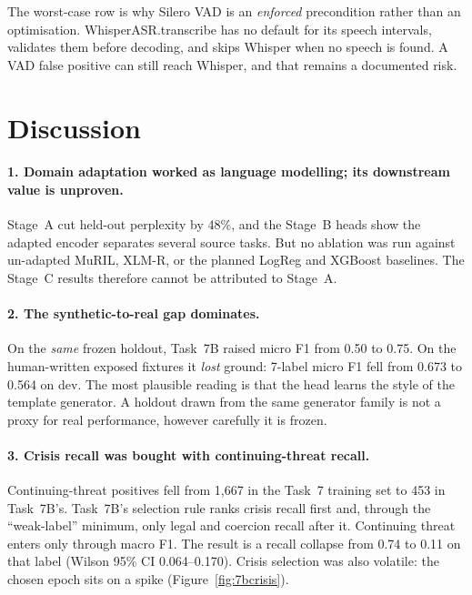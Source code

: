\documentclass[11pt,a4paper]{article}
\newcommand{\codeus}{\textunderscore\allowbreak}
\DeclareRobustCommand{\code}[1]{{\ttfamily\let\_\codeus #1}}
\begin{document}
\noindent The worst-case row is why Silero VAD is an \emph{enforced} precondition rather than an
optimisation. \code{WhisperASR.transcribe} has no default for its speech intervals, validates them
before decoding, and skips Whisper when no speech is found. A VAD false positive can still reach
Whisper, and that remains a documented risk.

\section{Discussion}
\label{sec:discussion}

\paragraph{1. Domain adaptation worked as language modelling; its downstream value is unproven.}
Stage~A cut held-out perplexity by 48\%, and the Stage~B heads show the adapted encoder separates
several source tasks. But no ablation was run against un-adapted MuRIL, XLM-R, or the planned
LogReg and XGBoost baselines. The Stage~C results therefore cannot be attributed to Stage~A.

\paragraph{2. The synthetic-to-real gap dominates.}
On the \emph{same} frozen holdout, Task~7B raised micro F1 from 0.50 to 0.75. On the human-written
exposed fixtures it \emph{lost} ground: 7-label micro F1 fell from 0.673 to 0.564 on dev. The most
plausible reading is that the head learns the style of the template generator. A holdout drawn from
the same generator family is not a proxy for real performance, however carefully it is frozen.

\paragraph{3. Crisis recall was bought with continuing-threat recall.}
Continuing-threat positives fell from 1{,}667 in the Task~7 training set to 453 in Task~7B's.
Task~7B's selection rule ranks crisis recall first and, through the ``weak-label'' minimum, only
legal and coercion recall after it. Continuing threat enters only through macro F1. The result is a
recall collapse from 0.74 to 0.11 on that label (Wilson 95\% CI 0.064--0.170). Crisis selection was
also volatile: the chosen epoch sits on a spike (Figure~\ref{fig:7bcrisis}).
\end{document}
